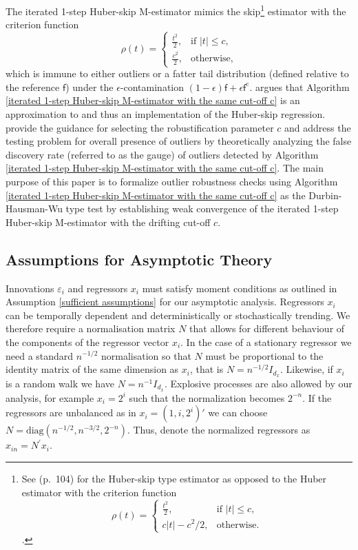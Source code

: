 \documentclass[11pt, letterpaper]{article}
\numberwithin{algorithm}{section}
\numberwithin{assumption}{section}
\numberwithin{lemma}{section}
\numberwithin{theorem}{section}
\numberwithin{corollary}{section}
\numberwithin{remark}{section}
\numberwithin{equation}{section}
\numberwithin{figure}{section}
\numberwithin{table}{section}
\begin{document}
The iterated 1-step Huber-skip M-estimator mimics the \cite{huber1964robust} skip\footnote{See \cite{hampel1986robust} (p.\ 104) for the Huber-skip type estimator as opposed to the Huber estimator with the criterion function
\begin{equation*}
\rho (t) =
\begin{cases}
\frac{t^{2}}{2}, & \mbox{if $|t| \le c$}, \\
c |t| - c^{2} / 2, & \mbox{otherwise}.
\end{cases}
\end{equation*}
.} estimator with the criterion function
\begin{equation} \label{Huber-skip criterion}
\rho (t) =
\begin{cases}
\frac{t^{2}}{2}, & \mbox{if $|t| \le c$}, \\
\frac{c^2}{2}, & \mbox{otherwise},
\end{cases}
\end{equation}
which is immune to either outliers or a fatter tail distribution (defined relative to the reference $\mathsf{f}$) under the $\epsilon$-contamination $(1 - \epsilon) \mathsf{f} + \epsilon \mathsf{f}^{\mathrm{c}}$. \cite{johansen2013outlier} argues that Algorithm \ref{iterated 1-step Huber-skip M-estimator with the same cut-off c} is an approximation to and thus an implementation of the Huber-skip regression. \cite{jiao2018testing} provide the guidance for selecting the robustification parameter $c$ and address the testing problem for overall presence of outliers by theoretically analyzing the false discovery rate (referred to as the gauge) of outliers detected by Algorithm \ref{iterated 1-step Huber-skip M-estimator with the same cut-off c}. The main purpose of this paper is to formalize outlier robustness checks using Algorithm \ref{iterated 1-step Huber-skip M-estimator with the same cut-off c} as the Durbin-Hausman-Wu type test by establishing weak convergence of the iterated 1-step Huber-skip M-estimator with the drifting cut-off $c$.


\subsection{Assumptions for Asymptotic Theory} \label{sec_assumptions}
Innovations $\varepsilon_{i}$ and regressors $x_{i}$ must satisfy moment conditions as outlined in Assumption \ref{sufficient assumptions} for our asymptotic analysis. Regressors $x_{i}$ can be temporally dependent and deterministically or stochastically trending. We therefore require a normalisation matrix $N$ that allows for different behaviour of the components of the regressor vector $x_i$. In the case of a stationary regressor we need a standard $n^{-1/2}$ normalisation so that $N$ must be proportional to the identity matrix of the same dimension as $x_i$, that is $N = n^{-1/2}I_{d_{x}}$. Likewise, if $x_i$ is a random walk we have $N = n^{-1}I_{d_{x}}$. Explosive processes are also allowed by our analysis, for example $x_{i} = 2^{i}$ such that the normalization becomes $2^{-n}$. If the regressors are unbalanced as in $x_i=(1, i, 2^{i})'$ we can choose $N=\mathrm{diag} (n^{-1/2}, n^{-3/2}, 2^{-n})$. Thus, denote the normalized regressors as $x_{in} = N^{\prime} x_{i}$.
\end{document}
